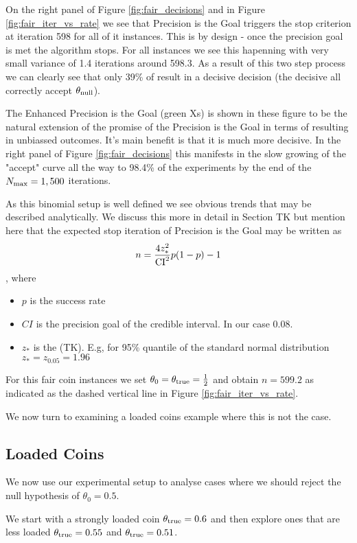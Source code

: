 On the right panel of Figure \ref{fig:fair_decisions} and in Figure \ref{fig:fair_iter_vs_rate}
we see that Precision is the Goal triggers the stop criterion at iteration 598 for all of
it instances. This is by design - once the precision goal is met the algorithm stops.
For all instances we see this hapenning with very small variance of 1.4 iterations around 598.3.
As a result of this two step process we can clearly see that only 39\% of result in a decisive decision
(the decisive all correctly accept $\theta_{\rm null}$). 

The Enhanced Precision is the Goal (green Xs) is shown in these figure to be the natural extension
of the promise of the Precision is the Goal in terms of resulting in unbiassed outcomes. It's main 
benefit is that it is much more decisive. In the right panel of Figure \ref{fig:fair_decisions}
this manifests in the slow growing of the "accept" curve all the way to 98.4\% of the experiments
by the end of the $N_{\rm max}=1,500$ iterations.

As this binomial setup is well defined we see obvious trends
that may be described analytically. We discuss this more in detail
in Section TK but mention here that the expected stop iteration of Precision is the Goal
may be written as $$n = \frac{4 z_{*}^2}{\rm{CI}^2}p(1-p) - 1$$,
where 

\begin{itemize}
  \item $p$ is the success rate
  \item $CI$ is the precision goal of the credible interval. In our case 0.08.
  \item $z_{*}$ is the (TK). E.g, for 95\% quantile of the standard normal
  distribution $z_{*}=z_{0.05}=1.96$
\end{itemize}

For this fair coin instances we set $\theta_0=\theta_{\rm true}=\frac{1}{2}$ and obtain
$n=599.2$ as indicated as the dashed vertical line in Figure \ref{fig:fair_iter_vs_rate}.

We now turn to examining a loaded coins example where this is not the case.

\subsection{Loaded Coins}
We now use our experimental setup to analyse cases where we should reject the null
hypothesis of $\theta_{0}=0.5$.

We start with a strongly loaded coin $\theta_{\rm true}=0.6$
and then explore ones that are less loaded $\theta_{\rm true}=0.55$ and
$\theta_{\rm true}=0.51$.

